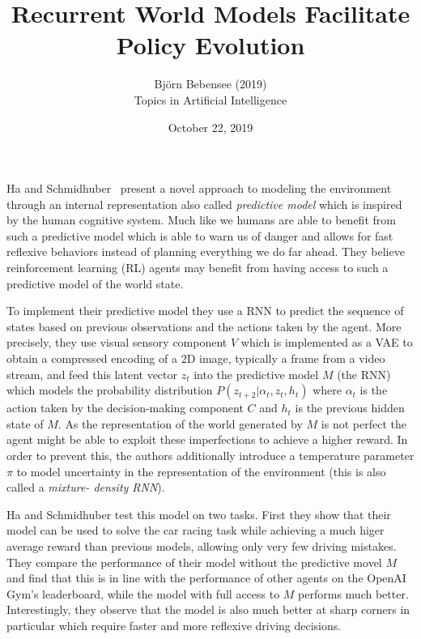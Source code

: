\documentclass[12pt]{article}
\begin{document}
 
 
\title{Recurrent World Models Facilitate Policy Evolution}
\author{Bj\"orn Bebensee (2019)\\ %
Topics in Artificial Intelligence}
\date{October 22, 2019}
\maketitle

\noindent
Ha and Schmidhuber~\cite{ha} present a novel approach to modeling the environment through an internal representation also called \emph{predictive model} which is inspired by the human cognitive system. Much like we humans are able to benefit from such a predictive model which is able to warn us of danger and allows for fast reflexive behaviors instead of planning everything we do far ahead. They believe reinforcement learning (RL) agents may benefit from having access to such a predictive model of the world state.

To implement their predictive model they use a RNN to predict the sequence of states based on previous observations and the actions taken by the agent. More precisely, they use visual sensory component $V$ which is implemented as a VAE to obtain a compressed encoding of a 2D image, typically a frame from a video stream, and feed this latent vector $z_t$ into the predictive model $M$ (the RNN) which models the probability distribution $P(z_{t+2} | \alpha_t, z_t, h_t)$ where $\alpha_t$ is the action taken by the decision-making component $C$ and $h_t$ is the previous hidden state of $M$. As the representation of the world generated by $M$ is not perfect the agent might be able to exploit these imperfections to achieve a higher reward. In order to prevent this, the authors additionally introduce a temperature parameter $\pi$ to model uncertainty in the representation of the environment (this is also called a \emph{mixture- density RNN}).

Ha and Schmidhuber test this model on two tasks. First they show that their model can be used to solve the car racing task while achieving a much higer average reward than previous models, allowing only very few driving mistakes. They compare the performance of their model without the predictive movel $M$ and find that this is in line with the performance of other agents on the OpenAI Gym's leaderboard, while the model with full access to $M$ performs much better. Interestingly, they observe that the model is also much better at sharp corners in particular which require faster and more reflexive driving decisions.
\end{document}
